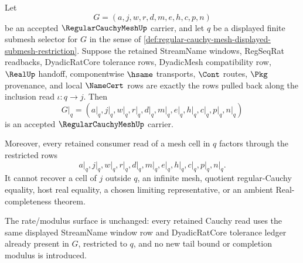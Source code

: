 \begin{theorem}
\label{thm:regular-cauchy-mesh-finite-submesh-restriction}
Let
$$
G=(a,j,w,r,d,m,e,h,c,p,n)
$$
be an accepted $\RegularCauchyMeshUp$ carrier, and let $q$ be a displayed finite submesh selector for $G$ in the sense of \autoref{def:regular-cauchy-mesh-displayed-submesh-restriction}. Suppose the retained StreamName windows, RegSeqRat readbacks, DyadicRatCore tolerance rows, DyadicMesh compatibility row, $\RealUp$ handoff, componentwise $\hsame$ transports, $\Cont$ routes, $\Pkg$ provenance, and local $\NameCert$ rows are exactly the rows pulled back along the inclusion read $\iota:q\to j$. Then
$$
G\vert_q=(a\vert_q,j\vert_q,w\vert_q,r\vert_q,d\vert_q,m\vert_q,e\vert_q,h\vert_q,c\vert_q,p\vert_q,n\vert_q)
$$
is an accepted $\RegularCauchyMeshUp$ carrier.

Moreover, every retained consumer read of a mesh cell in $q$ factors through the restricted rows
$$
a\vert_q,j\vert_q,w\vert_q,r\vert_q,d\vert_q,m\vert_q,e\vert_q,h\vert_q,c\vert_q,p\vert_q,n\vert_q.
$$
It cannot recover a cell of $j$ outside $q$, an infinite mesh, quotient regular-Cauchy equality, host real equality, a chosen limiting representative, or an ambient Real-completeness theorem.

The rate/modulus surface is unchanged: every retained Cauchy read uses the same displayed StreamName window row and DyadicRatCore tolerance ledger already present in $G$, restricted to $q$, and no new tail bound or completion modulus is introduced.
\end{theorem}
